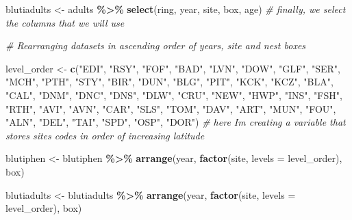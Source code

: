 \documentclass[
]{article}
\newenvironment{Shaded}{\begin{snugshade}}{\end{snugshade}}
\newcommand{\AttributeTok}[1]{\textcolor[rgb]{0.13,0.29,0.53}{#1}}
\newcommand{\CommentTok}[1]{\textcolor[rgb]{0.56,0.35,0.01}{\textit{#1}}}
\newcommand{\FunctionTok}[1]{\textcolor[rgb]{0.13,0.29,0.53}{\textbf{#1}}}
\newcommand{\NormalTok}[1]{#1}
\newcommand{\OtherTok}[1]{\textcolor[rgb]{0.56,0.35,0.01}{#1}}
\newcommand{\SpecialCharTok}[1]{\textcolor[rgb]{0.81,0.36,0.00}{\textbf{#1}}}
\newcommand{\StringTok}[1]{\textcolor[rgb]{0.31,0.60,0.02}{#1}}
\begin{document}
\begin{Shaded}
\begin{Highlighting}[]
\NormalTok{blutiadults }\OtherTok{\textless{}{-}}\NormalTok{ adults }\SpecialCharTok{\%\textgreater{}\%} \FunctionTok{select}\NormalTok{(ring, year, site, box, age)  }\CommentTok{\# finally, we select the columns that we will use}

\CommentTok{\# Rearranging datasets in ascending order of years, site and nest boxes}

\NormalTok{level\_order }\OtherTok{\textless{}{-}} \FunctionTok{c}\NormalTok{(}\StringTok{"EDI"}\NormalTok{, }\StringTok{"RSY"}\NormalTok{, }\StringTok{"FOF"}\NormalTok{, }\StringTok{"BAD"}\NormalTok{, }\StringTok{"LVN"}\NormalTok{, }\StringTok{"DOW"}\NormalTok{, }\StringTok{"GLF"}\NormalTok{, }\StringTok{"SER"}\NormalTok{, }\StringTok{"MCH"}\NormalTok{, }\StringTok{"PTH"}\NormalTok{, }\StringTok{"STY"}\NormalTok{, }\StringTok{"BIR"}\NormalTok{, }\StringTok{"DUN"}\NormalTok{, }\StringTok{"BLG"}\NormalTok{, }\StringTok{"PIT"}\NormalTok{, }\StringTok{"KCK"}\NormalTok{, }\StringTok{"KCZ"}\NormalTok{, }\StringTok{"BLA"}\NormalTok{, }\StringTok{"CAL"}\NormalTok{, }\StringTok{"DNM"}\NormalTok{, }\StringTok{"DNC"}\NormalTok{, }\StringTok{"DNS"}\NormalTok{, }\StringTok{"DLW"}\NormalTok{, }\StringTok{"CRU"}\NormalTok{, }\StringTok{"NEW"}\NormalTok{, }\StringTok{"HWP"}\NormalTok{, }\StringTok{"INS"}\NormalTok{, }\StringTok{"FSH"}\NormalTok{, }\StringTok{"RTH"}\NormalTok{, }\StringTok{"AVI"}\NormalTok{, }\StringTok{"AVN"}\NormalTok{, }\StringTok{"CAR"}\NormalTok{, }\StringTok{"SLS"}\NormalTok{, }\StringTok{"TOM"}\NormalTok{, }\StringTok{"DAV"}\NormalTok{, }\StringTok{"ART"}\NormalTok{, }\StringTok{"MUN"}\NormalTok{, }\StringTok{"FOU"}\NormalTok{, }\StringTok{"ALN"}\NormalTok{, }\StringTok{"DEL"}\NormalTok{, }\StringTok{"TAI"}\NormalTok{, }\StringTok{"SPD"}\NormalTok{, }\StringTok{"OSP"}\NormalTok{, }\StringTok{"DOR"}\NormalTok{)  }\CommentTok{\# here I\textquotesingle{}m creating a variable that stores sites\textquotesingle{} codes in order of increasing latitude}

\NormalTok{blutiphen }\OtherTok{\textless{}{-}}\NormalTok{ blutiphen }\SpecialCharTok{\%\textgreater{}\%} \FunctionTok{arrange}\NormalTok{(year, }\FunctionTok{factor}\NormalTok{(site, }\AttributeTok{levels =}\NormalTok{ level\_order), box) }

\NormalTok{blutiadults }\OtherTok{\textless{}{-}}\NormalTok{ blutiadults }\SpecialCharTok{\%\textgreater{}\%} \FunctionTok{arrange}\NormalTok{(year, }\FunctionTok{factor}\NormalTok{(site, }\AttributeTok{levels =}\NormalTok{ level\_order), box)  }
\end{Highlighting}
\end{Shaded}
\end{document}
